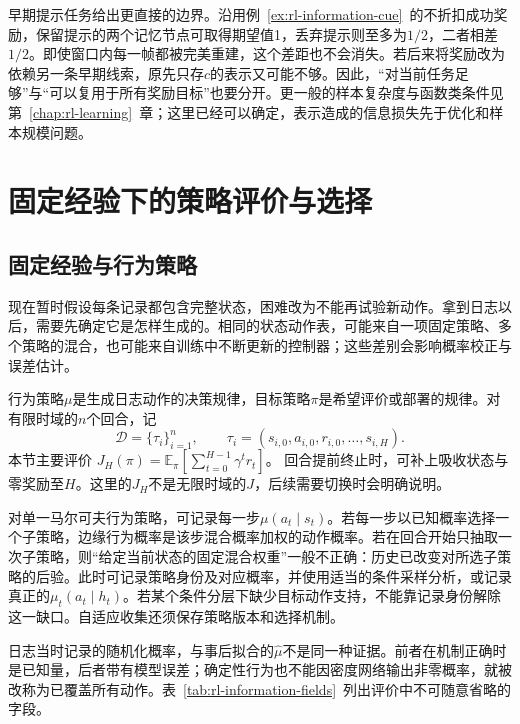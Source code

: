 早期提示任务给出更直接的边界。沿用例~\ref{ex:rl-information-cue}~的不折扣成功奖励，保留提示的两个记忆节点可取得期望值1，丢弃提示则至多为$1/2$，二者相差$1/2$。即使窗口内每一帧都被完美重建，这个差距也不会消失。若后来将奖励改为依赖另一条早期线索，原先只存$c$的表示又可能不够。因此，“对当前任务足够”与“可以复用于所有奖励目标”也要分开。更一般的样本复杂度与函数类条件见第~\ref{chap:rl-learning}~章；这里已经可以确定，表示造成的信息损失先于优化和样本规模问题。

\section{固定经验下的策略评价与选择}
\label{sec:rl-information-evaluation}

\subsection{固定经验与行为策略}
\label{sec:rl-information-logging}

现在暂时假设每条记录都包含完整状态，困难改为不能再试验新动作。拿到日志以后，需要先确定它是怎样生成的。相同的状态动作表，可能来自一项固定策略、多个策略的混合，也可能来自训练中不断更新的控制器；这些差别会影响概率校正与误差估计。

\begin{definition}[行为策略与目标策略]
  \label{def:rl-information-behavior}
  行为策略$\mu$是生成日志动作的决策规律，目标策略$\pi$是希望评价或部署的规律。对有限时域的$n$个回合，记
  \[
    \mathcal D=\{\tau_i\}_{i=1}^n,\qquad
    \tau_i=(s_{i,0},a_{i,0},r_{i,0},\ldots,s_{i,H}).
  \]
  本节主要评价
  $J_H(\pi)=\mathbb E_\pi[\sum_{t=0}^{H-1}\gamma^t r_t]$。
  回合提前终止时，可补上吸收状态与零奖励至$H$。这里的$J_H$不是无限时域的$J$，后续需要切换时会明确说明。
\end{definition}

对单一马尔可夫行为策略，可记录每一步$\mu(a_t\mid s_t)$。若每一步以已知概率选择一个子策略，边缘行为概率是该步混合概率加权的动作概率。若在回合开始只抽取一次子策略，则“给定当前状态的固定混合权重”一般不正确：历史已改变对所选子策略的后验。此时可记录策略身份及对应概率，并使用适当的条件采样分析，或记录真正的$\mu_t(a_t\mid h_t)$。若某个条件分层下缺少目标动作支持，不能靠记录身份解除这一缺口。自适应收集还须保存策略版本和选择机制。

日志当时记录的随机化概率，与事后拟合的$\widehat\mu$不是同一种证据。前者在机制正确时是已知量，后者带有模型误差；确定性行为也不能因密度网络输出非零概率，就被改称为已覆盖所有动作。表~\ref{tab:rl-information-fields}~列出评价中不可随意省略的字段。

